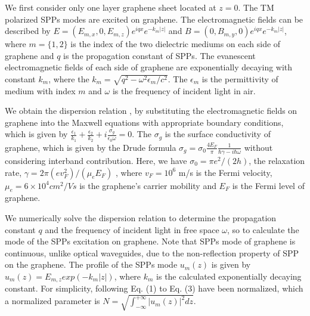 \documentclass[preprint,12pt,numbers,sort&compress]{elsarticle}
\begin{document}
We first consider only one layer graphene sheet located at $z=0$. The TM polarized SPPs modes are excited on graphene. The electromagnetic fields can be described by \cite{Bludov13} $E = (E_{m,x}, 0, E_{m,z}) e^{iqx} e^{-k_m |z|}$ and $B = (0, B_{m,y}, 0) e^{iqx} e^{-k_m |z|}$, where $m=\{1,2\}$ is the index of the two dielectric mediums on each side of graphene and $q$ is the propagation constant of SPPs.
The evanescent electromagnetic fields of each side of graphene are exponentially decaying with constant $k_{m}$, where the $k_{m}= \sqrt{q^2-\omega^2 \epsilon_{m}/c^2 }$. The $\epsilon_{m}$ is the permittivity of medium with index $m$ and $\omega$ is the frequency of incident light in air.

We obtain the dispersion relation \cite{Bludov13}, by substituting the electromagnetic fields on graphene into the Maxwell equations with appropriate boundary conditions, which is given by $\frac{\epsilon_1}{k_1} + \frac{\epsilon_2}{k_2} +i \frac{\sigma_g}{\epsilon_0 \omega} =0$. The $\sigma_g$ is the surface conductivity of graphene, which is given by the Drude formula $\sigma_g = \sigma_0 \frac{4 E_{F}}{\pi} \frac{1}{\hbar \gamma - i\hbar \omega}$ without considering interband contribution.
Here, we have $\sigma_0 = \pi e^2 /(2 h)$, the relaxation rate, $\gamma=2\pi (ev_{F}^2)/(\mu_{e} E_{F})$ \cite{Ooi16, Ooi17}, where $v_F=10^6$ m/s is the Fermi velocity, $\mu_e=6 \times 10^4 cm^{2}/Vs$ is the graphene's carrier mobility and $E_{F}$ is the Fermi level of graphene.

We numerically solve the dispersion relation to determine the propagation constant $q$ and the frequency of incident light in free space $\omega$, so to calculate the mode of the SPPs excitation on graphene.
Note that SPPs mode of graphene is continuous, unlike optical waveguides, due to the non-reflection property of SPP on the graphene.
The profile of the SPPs mode $u_{m}(z)$ is given by $u_{m}(z)=E_{m,z}exp(-k_{m}|z|)$, where $k_{m}$ is the calculated exponentially decaying constant.
For simplicity, following Eq. (1) to Eq. (3) have been normalized, which a normalized parameter is $N=\sqrt{\int^{+\infty}_{-\infty} |u_m(z)|^2 dz}$.
\end{document}
